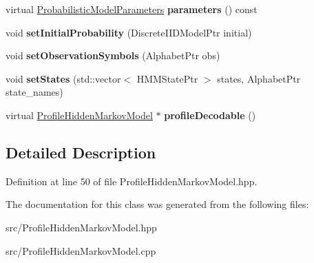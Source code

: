 \begin{DoxyCompactItemize}
\item 
\mbox{\label{classtops_1_1ProfileHiddenMarkovModel_a77acc1d4f82f38ddacdeea86ac109834}} 
virtual \hyperlink{classtops_1_1ProbabilisticModelParameters}{Probabilistic\+Model\+Parameters} {\bfseries parameters} () const
\item 
\mbox{\label{classtops_1_1ProfileHiddenMarkovModel_a1a858ddae08e5ba9fef3db90039a9a46}} 
void {\bfseries set\+Initial\+Probability} (Discrete\+I\+I\+D\+Model\+Ptr initial)
\item 
\mbox{\label{classtops_1_1ProfileHiddenMarkovModel_a33ec3bb5551fef5141433e3194e82d96}} 
void {\bfseries set\+Observation\+Symbols} (Alphabet\+Ptr obs)
\item 
\mbox{\label{classtops_1_1ProfileHiddenMarkovModel_a94196980cbbc12fc1eed8a696ddc2c28}} 
void {\bfseries set\+States} (std\+::vector$<$ H\+M\+M\+State\+Ptr $>$ states, Alphabet\+Ptr state\+\_\+names)
\item 
\mbox{\label{classtops_1_1ProfileHiddenMarkovModel_a7ecd8dc7da376c1ade6c1f740d05dcd1}} 
virtual \hyperlink{classtops_1_1ProfileHiddenMarkovModel}{Profile\+Hidden\+Markov\+Model} $\ast$ {\bfseries profile\+Decodable} ()
\end{DoxyCompactItemize}


\subsection{Detailed Description}


Definition at line 50 of file Profile\+Hidden\+Markov\+Model.\+hpp.



The documentation for this class was generated from the following files\+:\begin{DoxyCompactItemize}
\item 
src/Profile\+Hidden\+Markov\+Model.\+hpp\item 
src/Profile\+Hidden\+Markov\+Model.\+cpp\end{DoxyCompactItemize}
